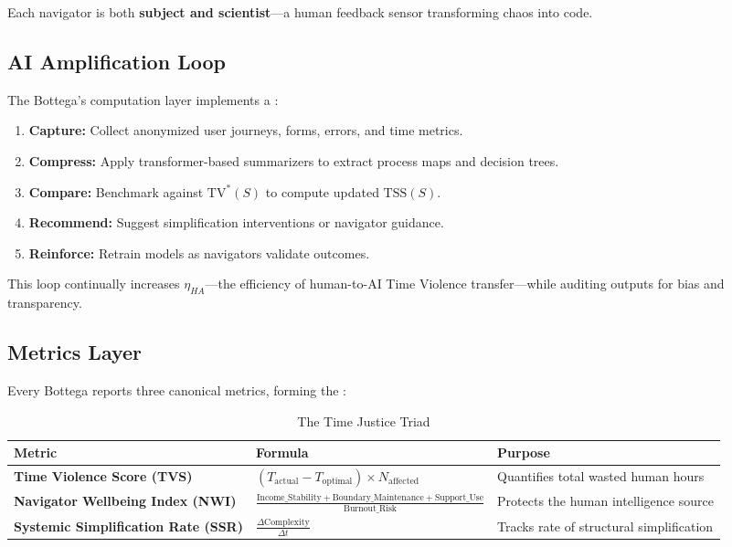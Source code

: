 Each navigator is both \textbf{subject and scientist}—a human feedback sensor transforming chaos into code.

\subsection{AI Amplification Loop}
\label{sec:ai-loop}

The Bottega's computation layer implements a :

\begin{enumerate}
    \item \textbf{Capture:} Collect anonymized user journeys, forms, errors, and time metrics.
    \item \textbf{Compress:} Apply transformer-based summarizers to extract process maps and decision trees.
    \item \textbf{Compare:} Benchmark against $\text{TV}^*(S)$ to compute updated $\text{TSS}(S)$.
    \item \textbf{Recommend:} Suggest simplification interventions or navigator guidance.
    \item \textbf{Reinforce:} Retrain models as navigators validate outcomes.
\end{enumerate}

This loop continually increases $\eta_{HA}$—the efficiency of human-to-AI Time Violence transfer—while auditing outputs for bias and transparency.

\subsection{Metrics Layer}
\label{sec:metrics-layer}

Every Bottega reports three canonical metrics, forming the :

\begin{table}[h]
\centering
\caption{The Time Justice Triad}
\label{tab:time-justice-triad}
\begin{tabular}{p{3.5cm}p{4.5cm}p{5cm}}
\toprule
\textbf{Metric} & \textbf{Formula} & \textbf{Purpose} \\
\midrule
\textbf{Time Violence Score (TVS)} & $(T_{\text{actual}} - T_{\text{optimal}}) \times N_{\text{affected}}$ & Quantifies total wasted human hours \\
\addlinespace
\textbf{Navigator Wellbeing Index (NWI)} & $\displaystyle\frac{\text{Income\_Stability} + \text{Boundary\_Maintenance} + \text{Support\_Use}}{\text{Burnout\_Risk}}$ & Protects the human intelligence source \\
\addlinespace
\textbf{Systemic Simplification Rate (SSR)} & $\displaystyle\frac{\Delta \text{Complexity}}{\Delta t}$ & Tracks rate of structural simplification \\
\bottomrule
\end{tabular}
\end{table}

